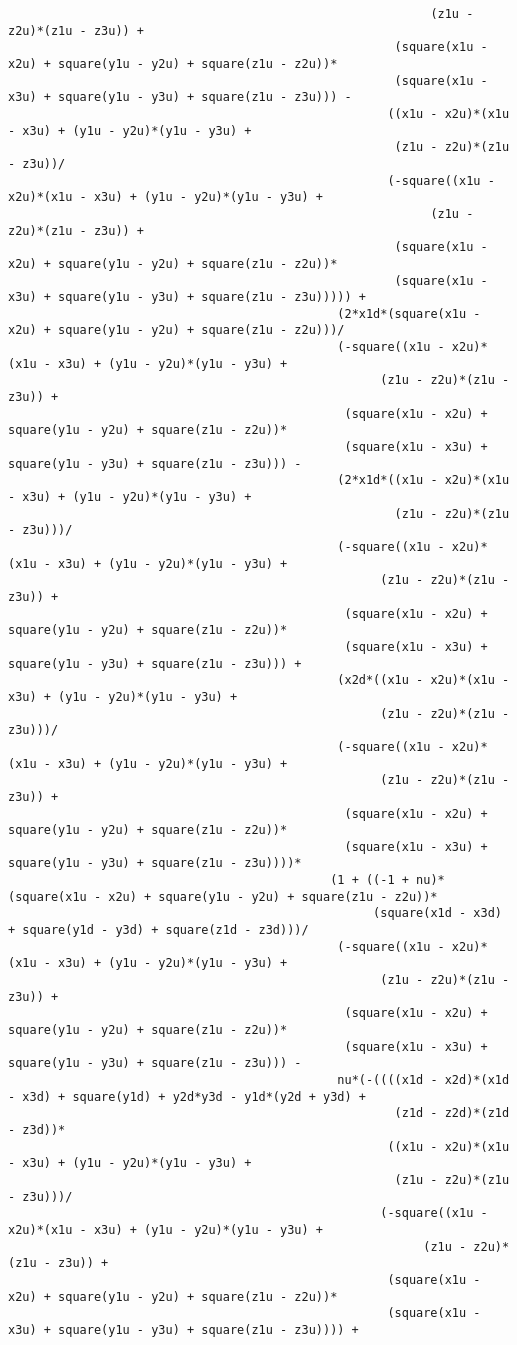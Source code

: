 \begin{lstlisting}
														   (z1u - z2u)*(z1u - z3u)) + 
													  (square(x1u - x2u) + square(y1u - y2u) + square(z1u - z2u))*
													  (square(x1u - x3u) + square(y1u - y3u) + square(z1u - z3u))) - 
													 ((x1u - x2u)*(x1u - x3u) + (y1u - y2u)*(y1u - y3u) + 
													  (z1u - z2u)*(z1u - z3u))/
													 (-square((x1u - x2u)*(x1u - x3u) + (y1u - y2u)*(y1u - y3u) + 
														   (z1u - z2u)*(z1u - z3u)) + 
													  (square(x1u - x2u) + square(y1u - y2u) + square(z1u - z2u))*
													  (square(x1u - x3u) + square(y1u - y3u) + square(z1u - z3u))))) + 
											  (2*x1d*(square(x1u - x2u) + square(y1u - y2u) + square(z1u - z2u)))/
											  (-square((x1u - x2u)*(x1u - x3u) + (y1u - y2u)*(y1u - y3u) + 
													(z1u - z2u)*(z1u - z3u)) + 
											   (square(x1u - x2u) + square(y1u - y2u) + square(z1u - z2u))*
											   (square(x1u - x3u) + square(y1u - y3u) + square(z1u - z3u))) - 
											  (2*x1d*((x1u - x2u)*(x1u - x3u) + (y1u - y2u)*(y1u - y3u) + 
													  (z1u - z2u)*(z1u - z3u)))/
											  (-square((x1u - x2u)*(x1u - x3u) + (y1u - y2u)*(y1u - y3u) + 
													(z1u - z2u)*(z1u - z3u)) + 
											   (square(x1u - x2u) + square(y1u - y2u) + square(z1u - z2u))*
											   (square(x1u - x3u) + square(y1u - y3u) + square(z1u - z3u))) + 
											  (x2d*((x1u - x2u)*(x1u - x3u) + (y1u - y2u)*(y1u - y3u) + 
													(z1u - z2u)*(z1u - z3u)))/
											  (-square((x1u - x2u)*(x1u - x3u) + (y1u - y2u)*(y1u - y3u) + 
													(z1u - z2u)*(z1u - z3u)) + 
											   (square(x1u - x2u) + square(y1u - y2u) + square(z1u - z2u))*
											   (square(x1u - x3u) + square(y1u - y3u) + square(z1u - z3u))))*
											 (1 + ((-1 + nu)*(square(x1u - x2u) + square(y1u - y2u) + square(z1u - z2u))*
												   (square(x1d - x3d) + square(y1d - y3d) + square(z1d - z3d)))/
											  (-square((x1u - x2u)*(x1u - x3u) + (y1u - y2u)*(y1u - y3u) + 
													(z1u - z2u)*(z1u - z3u)) + 
											   (square(x1u - x2u) + square(y1u - y2u) + square(z1u - z2u))*
											   (square(x1u - x3u) + square(y1u - y3u) + square(z1u - z3u))) - 
											  nu*(-((((x1d - x2d)*(x1d - x3d) + square(y1d) + y2d*y3d - y1d*(y2d + y3d) + 
													  (z1d - z2d)*(z1d - z3d))*
													 ((x1u - x2u)*(x1u - x3u) + (y1u - y2u)*(y1u - y3u) + 
													  (z1u - z2u)*(z1u - z3u)))/
													(-square((x1u - x2u)*(x1u - x3u) + (y1u - y2u)*(y1u - y3u) + 
														  (z1u - z2u)*(z1u - z3u)) + 
													 (square(x1u - x2u) + square(y1u - y2u) + square(z1u - z2u))*
													 (square(x1u - x3u) + square(y1u - y3u) + square(z1u - z3u)))) + 

\end{lstlisting}
